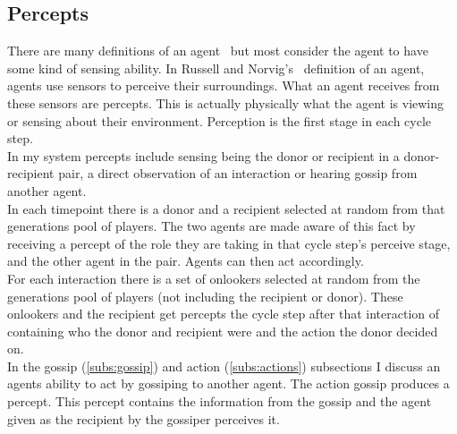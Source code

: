 \documentclass[]{final_report}
\begin{document}
\subsection{Percepts}
\label{subs:percepts}
There are many definitions of an agent~\cite{franklin1996agent} but most consider the agent to have some kind of sensing ability. In Russell and Norvig's~\cite{russell2016artificial} definition of an agent, agents use sensors to perceive their surroundings. What an agent receives from these sensors are percepts. This is actually physically what the agent is viewing or sensing about their environment. Perception is the first stage in each cycle step.\\
In my system percepts include sensing being the donor or recipient in a donor-recipient pair, a direct observation of an interaction or hearing gossip from another agent.\\
In each timepoint there is a donor and a recipient selected at random from that generations pool of players. The two agents are made aware of this fact by receiving a percept of the role they are taking in that cycle step's perceive stage, and the other agent in the pair. Agents can then act accordingly.\\
For each interaction there is a set of onlookers selected at random from the generations pool of players (not including the recipient or donor). These onlookers and the recipient get percepts the cycle step after that interaction of containing who the donor and recipient were and the action the donor decided on.\\
In the gossip (\ref{subs:gossip}) and action (\ref{subs:actions}) subsections I discuss an agents ability to act by gossiping to another agent. The action gossip produces a percept. This percept contains the information from the gossip and the agent given as the recipient by the gossiper perceives it.
\end{document}
